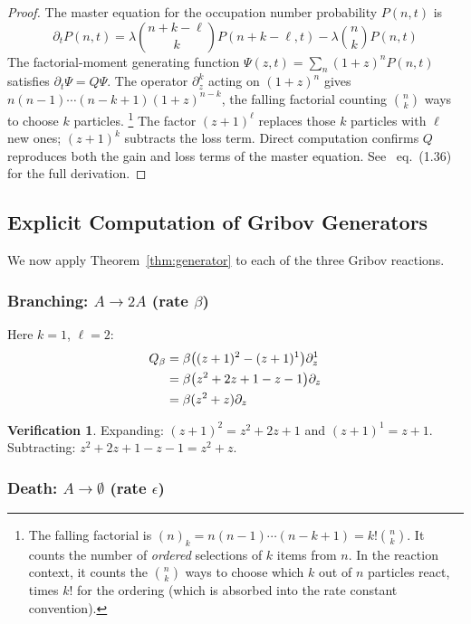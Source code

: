 \documentclass[11pt,a4paper]{article}
\theoremstyle{definition}
\newtheorem*{verification}{Verification}
\begin{document}
\begin{proof}
The master equation for the occupation number probability $P(n,t)$ is
\[
\partial_t P(n,t) = \lambda \binom{n+k-\ell}{k} P(n+k-\ell,t) - \lambda \binom{n}{k} P(n,t)
\]
The factorial-moment generating function $\Psi(z,t) = \sum_n (1+z)^n P(n,t)$
satisfies $\partial_t \Psi = Q \Psi$. The operator $\partial_z^k$ acting on
$(1+z)^n$ gives $n(n{-}1)\cdots(n{-}k{+}1)(1{+}z)^{n-k}$, the falling factorial
counting $\binom{n}{k}$ ways to choose $k$ particles.%
\footnote{The falling factorial is $(n)_k = n(n{-}1)\cdots(n{-}k{+}1) = k!\binom{n}{k}$.
It counts the number of \emph{ordered} selections of $k$ items from $n$.
In the reaction context, it counts the $\binom{n}{k}$ ways to choose
which $k$ out of $n$ particles react, times $k!$ for the ordering
(which is absorbed into the rate constant convention).} The factor $(z{+}1)^\ell$
replaces those $k$ particles with $\ell$ new ones; $(z{+}1)^k$ subtracts the
loss term. Direct computation confirms $Q$ reproduces both the gain and loss
terms of the master equation. See~\cite{amarteifio2019} eq.~(1.36) for the
full derivation.
\end{proof}

\subsection{Explicit Computation of Gribov Generators}

We now apply Theorem~\ref{thm:generator} to each of the three Gribov reactions.

\subsubsection{Branching: $A \to 2A$ (rate $\beta$)}

Here $k=1$, $\ell=2$:
\begin{align}
Q_\beta &= \beta \bigl((z+1)^2 - (z+1)^1\bigr) \partial_z^1 \notag \\
        &= \beta \bigl(z^2 + 2z + 1 - z - 1\bigr) \partial_z \notag \\
        &= \beta (z^2 + z) \partial_z
\label{eq:Q_beta}
\end{align}

\begin{verification}
Expanding: $(z{+}1)^2 = z^2 + 2z + 1$ and $(z{+}1)^1 = z + 1$.
Subtracting: $z^2 + 2z + 1 - z - 1 = z^2 + z$. \checkmark
\end{verification}

\subsubsection{Death: $A \to \emptyset$ (rate $\epsilon$)}
\end{document}
